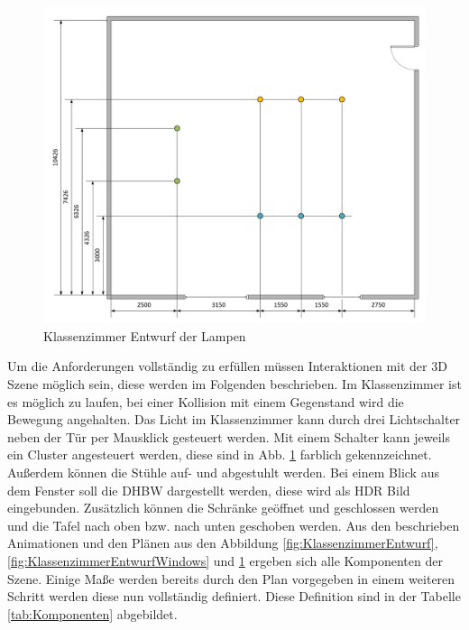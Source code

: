\begin{figure}[H]
  \centering
  \includegraphics[width=1\textwidth]{images/classroom_draw_lamps.pdf}
  \caption{Klassenzimmer Entwurf der Lampen}
  \label{fig:KlassenzimmerEntwurfLamps}
\end{figure}\noindent
Um die Anforderungen vollständig zu erfüllen müssen Interaktionen mit der 3D Szene möglich sein, diese werden im Folgenden beschrieben.
\newparagraph
Im Klassenzimmer ist es möglich zu laufen, bei einer Kollision mit einem Gegenstand wird die Bewegung angehalten.
Das Licht im Klassenzimmer kann durch drei Lichtschalter neben der Tür per Mausklick gesteuert werden. Mit einem Schalter kann jeweils ein Cluster angesteuert werden, diese sind in Abb. \ref{fig:KlassenzimmerEntwurfLamps}
farblich gekennzeichnet.
Außerdem können die Stühle auf- und abgestuhlt werden. Bei einem Blick aus dem Fenster
soll die DHBW dargestellt werden, diese wird als \ac{HDR} Bild eingebunden. Zusätzlich können die Schränke geöffnet und geschlossen werden und die Tafel nach oben bzw. nach unten geschoben werden.
\newparagraph
Aus den beschrieben Animationen und den Plänen aus den Abbildung \ref{fig:KlassenzimmerEntwurf}, \ref{fig:KlassenzimmerEntwurfWindows} und \ref{fig:KlassenzimmerEntwurfLamps} ergeben sich alle Komponenten der Szene. 
Einige Maße werden bereits durch den Plan vorgegeben in einem weiteren Schritt werden diese nun vollständig definiert.
Diese Definition sind in der Tabelle \ref{tab:Komponenten} abgebildet.

